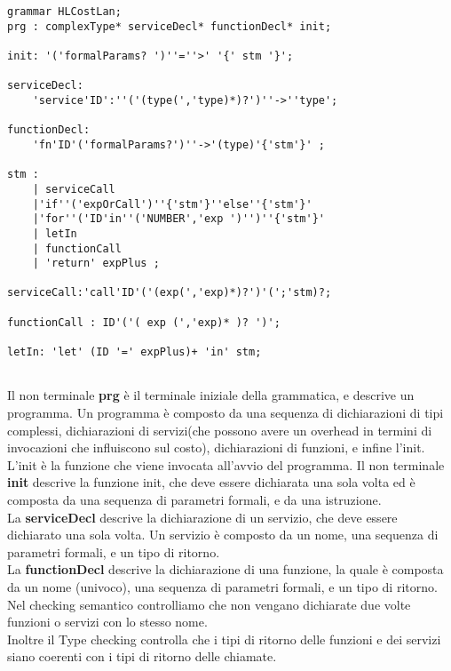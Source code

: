\documentclass[../../main.tex]{subfiles}
\begin{document}
\begin{lstlisting}[language=ANTLR, caption={Grammatica del linguaggio HLCostLan}, label={sec:grammatica}]
grammar HLCostLan;
prg : complexType* serviceDecl* functionDecl* init;
    
init: '('formalParams? ')''=''>' '{' stm '}';
    
serviceDecl:
    'service'ID':''('(type(','type)*)?')''->''type';
    
functionDecl:
    'fn'ID'('formalParams?')''->'(type)'{'stm'}' ;
    
stm :
    | serviceCall
    |'if''('expOrCall')''{'stm'}''else''{'stm'}'
    |'for''('ID'in''('NUMBER','exp ')'')''{'stm'}'  
    | letIn
    | functionCall
    | 'return' expPlus ;
    
serviceCall:'call'ID'('(exp(','exp)*)?')'(';'stm)?;

functionCall : ID'('( exp (','exp)* )? ')';

letIn: 'let' (ID '=' expPlus)+ 'in' stm;
                                   
\end{lstlisting}
Il non terminale \textbf{prg} è il terminale iniziale della grammatica, e descrive un programma. Un programma è composto da una sequenza di dichiarazioni di tipi complessi, dichiarazioni di servizi(che possono avere un overhead in termini di invocazioni che influiscono sul costo), dichiarazioni di funzioni, e infine l'init. L'init è la funzione che viene invocata all'avvio del programma.
Il non terminale \textbf{init} descrive la funzione init, che deve essere dichiarata una sola volta ed è composta da una sequenza di parametri formali, e da una istruzione.\\
La \textbf{serviceDecl} descrive la dichiarazione di un servizio, che deve essere dichiarato una sola volta. Un servizio è composto da un nome, una sequenza di parametri formali, e un tipo di ritorno.\\
La \textbf{functionDecl} descrive la dichiarazione di una funzione, la quale è composta da un nome (univoco), una sequenza di parametri formali, e un tipo di ritorno.
Nel checking semantico controlliamo che non vengano dichiarate due volte funzioni o servizi con lo stesso nome.\\
Inoltre il Type checking controlla che i tipi di ritorno delle funzioni e dei servizi siano coerenti con i tipi di ritorno delle chiamate.\\
\end{document}
